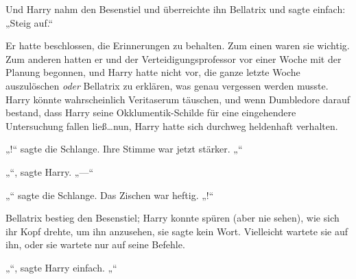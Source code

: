 Und Harry nahm den Besenstiel und überreichte ihn Bellatrix und sagte einfach: „Steig auf.“

Er hatte beschlossen, die Erinnerungen zu behalten. Zum einen waren sie wichtig. Zum anderen hatten er und der Verteidigungsprofessor vor einer Woche mit der Planung begonnen, und Harry hatte nicht vor, die ganze letzte Woche auszulöschen \emph{oder} Bellatrix zu erklären, was genau vergessen werden musste. Harry könnte wahrscheinlich Veritaserum täuschen, und wenn Dumbledore darauf bestand, dass Harry seine Okklumentik-Schilde für eine eingehendere Untersuchung fallen ließ…nun, Harry hatte sich durchweg heldenhaft verhalten.

„!“ sagte die Schlange. Ihre Stimme war jetzt stärker. „“

„“, sagte Harry. „—“

„“ sagte die Schlange. Das Zischen war heftig. „!“

Bellatrix bestieg den Besenstiel; Harry konnte spüren (aber nie sehen), wie sich ihr Kopf drehte, um ihn anzusehen, sie sagte kein Wort. Vielleicht wartete sie auf ihn, oder sie wartete nur auf seine Befehle.

„“, sagte Harry einfach. „“

